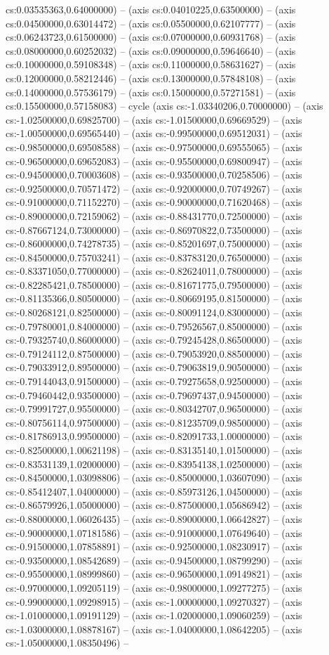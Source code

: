 cs:0.03535363,0.64000000) -- (axis cs:0.04010225,0.63500000) -- (axis cs:0.04500000,0.63014472) -- (axis cs:0.05500000,0.62107777) -- (axis cs:0.06243723,0.61500000) -- (axis cs:0.07000000,0.60931768) -- (axis cs:0.08000000,0.60252032) -- (axis cs:0.09000000,0.59646640) -- (axis cs:0.10000000,0.59108348) -- (axis cs:0.11000000,0.58631627) -- (axis cs:0.12000000,0.58212446) -- (axis cs:0.13000000,0.57848108) -- (axis cs:0.14000000,0.57536179) -- (axis cs:0.15000000,0.57271581) -- (axis cs:0.15500000,0.57158083) -- cycle (axis cs:-1.03340206,0.70000000) -- (axis cs:-1.02500000,0.69825700) -- (axis cs:-1.01500000,0.69669529) -- (axis cs:-1.00500000,0.69565440) -- (axis cs:-0.99500000,0.69512031) -- (axis cs:-0.98500000,0.69508588) -- (axis cs:-0.97500000,0.69555065) -- (axis cs:-0.96500000,0.69652083) -- (axis cs:-0.95500000,0.69800947) -- (axis cs:-0.94500000,0.70003608) -- (axis cs:-0.93500000,0.70258506) -- (axis cs:-0.92500000,0.70571472) -- (axis cs:-0.92000000,0.70749267) -- (axis cs:-0.91000000,0.71152270) -- (axis cs:-0.90000000,0.71620468) -- (axis cs:-0.89000000,0.72159062) -- (axis cs:-0.88431770,0.72500000) -- (axis cs:-0.87667124,0.73000000) -- (axis cs:-0.86970822,0.73500000) -- (axis cs:-0.86000000,0.74278735) -- (axis cs:-0.85201697,0.75000000) -- (axis cs:-0.84500000,0.75703241) -- (axis cs:-0.83783120,0.76500000) -- (axis cs:-0.83371050,0.77000000) -- (axis cs:-0.82624011,0.78000000) -- (axis cs:-0.82285421,0.78500000) -- (axis cs:-0.81671775,0.79500000) -- (axis cs:-0.81135366,0.80500000) -- (axis cs:-0.80669195,0.81500000) -- (axis cs:-0.80268121,0.82500000) -- (axis cs:-0.80091124,0.83000000) -- (axis cs:-0.79780001,0.84000000) -- (axis cs:-0.79526567,0.85000000) -- (axis cs:-0.79325740,0.86000000) -- (axis cs:-0.79245428,0.86500000) -- (axis cs:-0.79124112,0.87500000) -- (axis cs:-0.79053920,0.88500000) -- (axis cs:-0.79033912,0.89500000) -- (axis cs:-0.79063819,0.90500000) -- (axis cs:-0.79144043,0.91500000) -- (axis cs:-0.79275658,0.92500000) -- (axis cs:-0.79460442,0.93500000) -- (axis cs:-0.79697437,0.94500000) -- (axis cs:-0.79991727,0.95500000) -- (axis cs:-0.80342707,0.96500000) -- (axis cs:-0.80756114,0.97500000) -- (axis cs:-0.81235709,0.98500000) -- (axis cs:-0.81786913,0.99500000) -- (axis cs:-0.82091733,1.00000000) -- (axis cs:-0.82500000,1.00621198) -- (axis cs:-0.83135140,1.01500000) -- (axis cs:-0.83531139,1.02000000) -- (axis cs:-0.83954138,1.02500000) -- (axis cs:-0.84500000,1.03098806) -- (axis cs:-0.85000000,1.03607090) -- (axis cs:-0.85412407,1.04000000) -- (axis cs:-0.85973126,1.04500000) -- (axis cs:-0.86579926,1.05000000) -- (axis cs:-0.87500000,1.05686942) -- (axis cs:-0.88000000,1.06026435) -- (axis cs:-0.89000000,1.06642827) -- (axis cs:-0.90000000,1.07181586) -- (axis cs:-0.91000000,1.07649640) -- (axis cs:-0.91500000,1.07858891) -- (axis cs:-0.92500000,1.08230917) -- (axis cs:-0.93500000,1.08542689) -- (axis cs:-0.94500000,1.08799290) -- (axis cs:-0.95500000,1.08999860) -- (axis cs:-0.96500000,1.09149821) -- (axis cs:-0.97000000,1.09205119) -- (axis cs:-0.98000000,1.09277275) -- (axis cs:-0.99000000,1.09298915) -- (axis cs:-1.00000000,1.09270327) -- (axis cs:-1.01000000,1.09191129) -- (axis cs:-1.02000000,1.09060259) -- (axis cs:-1.03000000,1.08878167) -- (axis cs:-1.04000000,1.08642205) -- (axis cs:-1.05000000,1.08350496) -- 
